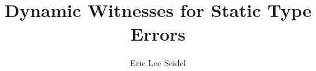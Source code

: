 \documentclass[12pt]{ucsddissertation}
\title{Dynamic Witnesses for Static Type Errors}
\author{Eric Lee Seidel}
\theoremstyle{plain}%
\theoremstyle{definition}
\begin{document}
\frontmatter
\maketitle
\makecopyright
\makesignature








\tableofcontents
\listoffigures
\listoftables
\end{document}
